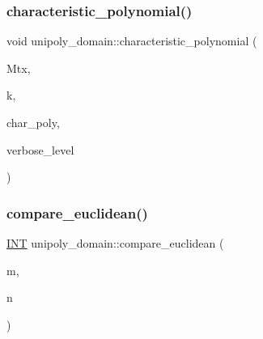 \mbox{\label{classunipoly__domain_a8fc6545a5f52b768f6ebb2e3b3d57539}} 
\subsubsection{\texorpdfstring{characteristic\+\_\+polynomial()}{characteristic\_polynomial()}}
{\footnotesize\ttfamily void unipoly\+\_\+domain\+::characteristic\+\_\+polynomial (\begin{DoxyParamCaption}\item[{\mbox{\hyperlink{galois_8h_a09fddde158a3a20bd2dcadb609de11dc}{I\+NT}} $\ast$}]{Mtx,  }\item[{\mbox{\hyperlink{galois_8h_a09fddde158a3a20bd2dcadb609de11dc}{I\+NT}}}]{k,  }\item[{\mbox{\hyperlink{galois_8h_a77ca58de3d2da6172242493dd9c8aaa8}{unipoly\+\_\+object}} \&}]{char\+\_\+poly,  }\item[{\mbox{\hyperlink{galois_8h_a09fddde158a3a20bd2dcadb609de11dc}{I\+NT}}}]{verbose\+\_\+level }\end{DoxyParamCaption})}

\mbox{\label{classunipoly__domain_a2f2fb29ee3df51c0d80a8626216dbd27}} 
\subsubsection{\texorpdfstring{compare\+\_\+euclidean()}{compare\_euclidean()}}
{\footnotesize\ttfamily \mbox{\hyperlink{galois_8h_a09fddde158a3a20bd2dcadb609de11dc}{I\+NT}} unipoly\+\_\+domain\+::compare\+\_\+euclidean (\begin{DoxyParamCaption}\item[{\mbox{\hyperlink{galois_8h_a77ca58de3d2da6172242493dd9c8aaa8}{unipoly\+\_\+object}}}]{m,  }\item[{\mbox{\hyperlink{galois_8h_a77ca58de3d2da6172242493dd9c8aaa8}{unipoly\+\_\+object}}}]{n }\end{DoxyParamCaption})}

\mbox{\label{classunipoly__domain_a2684c35bcb208f046b77da3ef1248daf}} 
